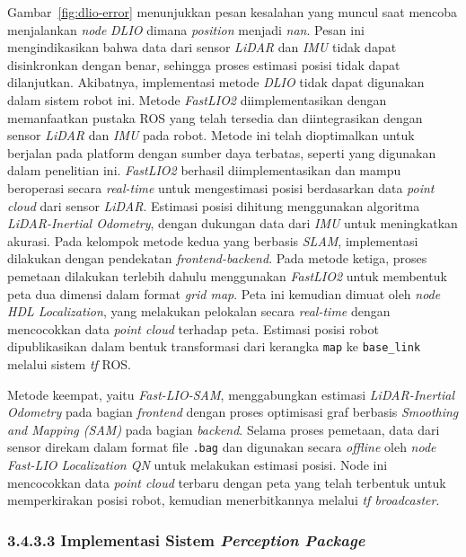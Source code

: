 Gambar~\ref{fig:dlio-error} menunjukkan pesan kesalahan yang muncul saat mencoba menjalankan \emph{node} \emph{DLIO} dimana \emph{position} menjadi \emph{nan}. Pesan ini mengindikasikan bahwa data dari sensor \emph{LiDAR} dan \emph{IMU} tidak dapat disinkronkan dengan benar, sehingga proses estimasi posisi tidak dapat dilanjutkan. Akibatnya, implementasi metode \emph{DLIO} tidak dapat digunakan dalam sistem robot ini. Metode \emph{FastLIO2} diimplementasikan dengan memanfaatkan pustaka ROS yang telah tersedia dan diintegrasikan dengan sensor \emph{LiDAR} dan \emph{IMU} pada robot. Metode ini telah dioptimalkan untuk berjalan pada platform dengan sumber daya terbatas, seperti yang digunakan dalam penelitian ini. \emph{FastLIO2} berhasil diimplementasikan dan mampu beroperasi secara \emph{real-time} untuk mengestimasi posisi berdasarkan data \emph{point cloud} dari sensor \emph{LiDAR}. Estimasi posisi dihitung menggunakan algoritma \emph{LiDAR-Inertial Odometry}, dengan dukungan data dari \emph{IMU} untuk meningkatkan akurasi. Pada kelompok metode kedua yang berbasis \emph{SLAM}, implementasi dilakukan dengan pendekatan \emph{frontend-backend}. Pada metode ketiga, proses pemetaan dilakukan terlebih dahulu menggunakan \emph{FastLIO2} untuk membentuk peta dua dimensi dalam format \emph{grid map}. Peta ini kemudian dimuat oleh \emph{node} \emph{HDL Localization}, yang melakukan pelokalan secara \emph{real-time} dengan mencocokkan data \emph{point cloud} terhadap peta. Estimasi posisi robot dipublikasikan dalam bentuk transformasi dari kerangka \texttt{map} ke \texttt{base\_link} melalui sistem \emph{tf} ROS.

Metode keempat, yaitu \emph{Fast-LIO-SAM}, menggabungkan estimasi \emph{LiDAR-Inertial Odometry} pada bagian \emph{frontend} dengan proses optimisasi graf berbasis \emph{Smoothing and Mapping (SAM)} pada bagian \emph{backend}. Selama proses pemetaan, data dari sensor direkam dalam format file \texttt{.bag} dan digunakan secara \emph{offline} oleh \emph{node} \emph{Fast-LIO Localization QN} untuk melakukan estimasi posisi. Node ini mencocokkan data \emph{point cloud} terbaru dengan peta yang telah terbentuk untuk memperkirakan posisi robot, kemudian menerbitkannya melalui \emph{tf broadcaster}. 


\subsubsection{3.4.3.3 Implementasi Sistem \emph{Perception Package}}

